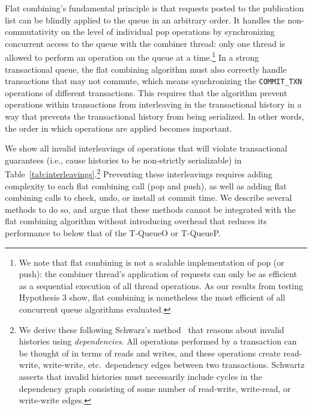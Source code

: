 Flat combining's fundamental principle is that requests posted to the publication list can be blindly applied to the queue in an arbitrary order. It handles the non-commutativity on the level of individual pop operations by synchronizing concurrent access to the queue with the combiner thread: only one thread is allowed to perform an operation on the queue at a time.\footnote{We note that flat combining is not a scalable implementation of pop (or push): the combiner thread's application of requests can only be as efficient as a sequential execution of all thread operations. As our results from testing Hypothesis 3 show, flat combining is nonetheless the most efficient of all concurrent queue algorithms evaluated.}
In a strong transactional queue, the flat combining algorithm must also correctly handle transactions that may not commute, which means synchronizing the \texttt{COMMIT\_TXN} operations of different transactions. This requires that the algorithm prevent operations within transactions from interleaving in the transactional history in a way that prevents the transactional history from being serialized. In other words, the order in which operations are applied becomes important.

We show all invalid interleavings of operations that will violate transactional guarantees (i.e., cause histories to be non-strictly serializable) in Table~\ref{tab:interleavings}.\footnote{We derive these following Schwarz's method~\cite{schwarz} that reasons about invalid histories using \emph{dependencies}. All operations performed by a transaction can be thought of in terms of reads and writes, and these operations create read-write, write-write, etc.\ dependency edges between two transactions. Schwartz asserts that invalid histories must necessarily include cycles in the dependency graph consisting of some number of read-write, write-read, or write-write edges.}
Preventing these interleavings requires adding complexity to each flat combining call (pop and push), as well as adding flat combining calls to check, undo, or install at commit time. We describe several methods to do so, and argue that these methods cannot be integrated with the flat combining algorithm without introducing overhead that reduces its performance to below that of the T-QueueO or T-QueueP. 

